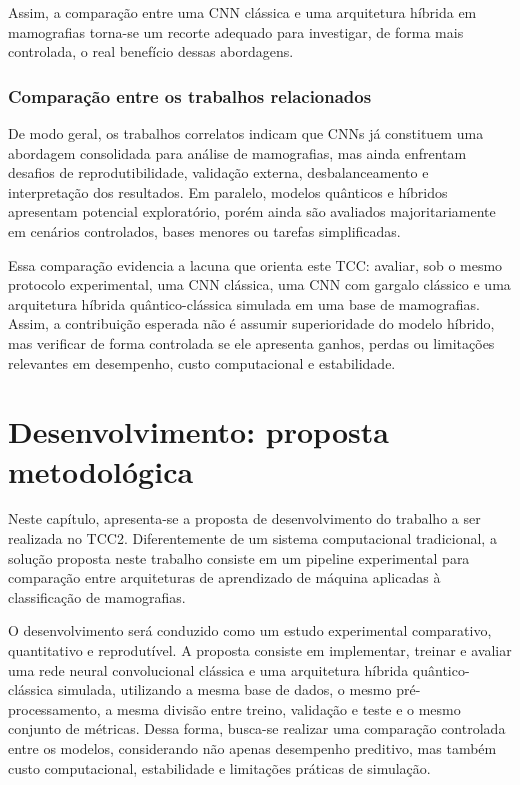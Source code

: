 \documentclass[
    12pt,
    openright,
    oneside,
    a4paper,
    english,
    brazil
]{abntex2}
\begin{document}
Assim, a comparação entre uma CNN clássica e uma arquitetura híbrida em mamografias torna-se um recorte adequado para investigar, de forma mais controlada, o real benefício dessas abordagens.

\subsection{Comparação entre os trabalhos relacionados}

De modo geral, os trabalhos correlatos indicam que CNNs já constituem uma abordagem consolidada para análise de mamografias, mas ainda enfrentam desafios de reprodutibilidade, validação externa, desbalanceamento e interpretação dos resultados. Em paralelo, modelos quânticos e híbridos apresentam potencial exploratório, porém ainda são avaliados majoritariamente em cenários controlados, bases menores ou tarefas simplificadas.

Essa comparação evidencia a lacuna que orienta este TCC: avaliar, sob o mesmo protocolo experimental, uma CNN clássica, uma CNN com gargalo clássico e uma arquitetura híbrida quântico-clássica simulada em uma base de mamografias. Assim, a contribuição esperada não é assumir superioridade do modelo híbrido, mas verificar de forma controlada se ele apresenta ganhos, perdas ou limitações relevantes em desempenho, custo computacional e estabilidade.


\chapter{Desenvolvimento: proposta metodológica}
\label{cap:desenvolvimento}

Neste capítulo, apresenta-se a proposta de desenvolvimento do trabalho a ser realizada no TCC2. Diferentemente de um sistema computacional tradicional, a solução proposta neste trabalho consiste em um pipeline experimental para comparação entre arquiteturas de aprendizado de máquina aplicadas à classificação de mamografias.

O desenvolvimento será conduzido como um estudo experimental comparativo, quantitativo e reprodutível. A proposta consiste em implementar, treinar e avaliar uma rede neural convolucional clássica e uma arquitetura híbrida quântico-clássica simulada, utilizando a mesma base de dados, o mesmo pré-processamento, a mesma divisão entre treino, validação e teste e o mesmo conjunto de métricas. Dessa forma, busca-se realizar uma comparação controlada entre os modelos, considerando não apenas desempenho preditivo, mas também custo computacional, estabilidade e limitações práticas de simulação.
\end{document}
